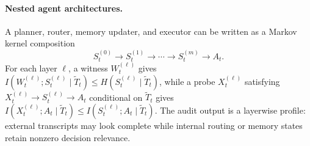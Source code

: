   \paragraph{Nested agent architectures.}
  A planner, router, memory updater, and executor can be written as a Markov
  kernel composition
  \[
    S_t^{(0)}\to S_t^{(1)}\to\cdots\to S_t^{(m)}\to A_t .
  \]
  For each layer $\ell$, a witness $W_t^{(\ell)}$ gives
  $I(W_t^{(\ell)};S_t^{(\ell)}\mid\tilde T_t)\leq
  H(S_t^{(\ell)}\mid\tilde T_t)$, while a probe $X_t^{(\ell)}$ satisfying
  $X_t^{(\ell)}\to S_t^{(\ell)}\to A_t$ conditional on $\tilde T_t$ gives
  $I(X_t^{(\ell)};A_t\mid\tilde T_t)\leq
  I(S_t^{(\ell)};A_t\mid\tilde T_t)$. The audit output is a layerwise profile:
  external transcripts may look complete while internal routing or memory states
  retain nonzero decision relevance.
